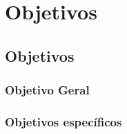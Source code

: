 \part{Objetivos}
\chapter[Objetivos]{Objetivos}

\section{Objetivo Geral}
    


\section{Objetivos específicos}
    